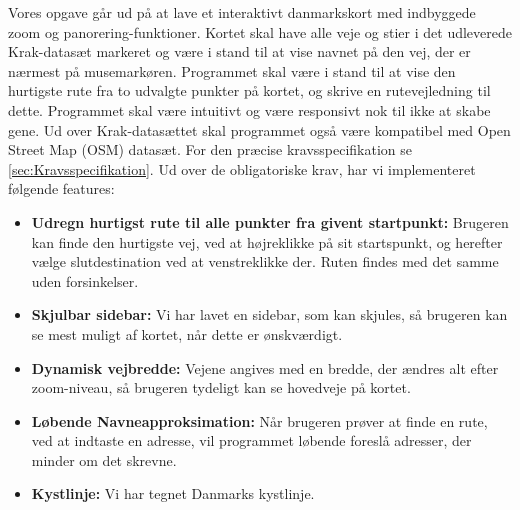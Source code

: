 Vores opgave går ud på at lave et interaktivt danmarkskort med indbyggede zoom og panorering-funktioner. Kortet skal have alle veje og stier i det udleverede Krak-datasæt markeret og være i stand til at vise navnet på den vej, der er nærmest på musemarkøren. Programmet skal være i stand til at vise den hurtigste rute fra to udvalgte punkter på kortet, og skrive en rutevejledning til dette. Programmet skal være intuitivt og være responsivt nok til ikke at skabe gene. Ud over Krak-datasættet skal programmet også være kompatibel med Open Street Map (OSM) datasæt. For den præcise kravsspecifikation se \ref{sec:Kravsspecifikation}.
\newline \newline
Ud over de obligatoriske krav, har vi implementeret følgende features:
\begin{itemize}
	\item \textbf{Udregn hurtigst rute til alle punkter fra givent startpunkt:} Brugeren kan finde den hurtigste vej, ved at højreklikke på sit startspunkt, og herefter vælge  slutdestination ved at venstreklikke der. Ruten findes med det samme uden forsinkelser.
	\item \textbf{Skjulbar sidebar:} Vi har lavet en sidebar, som kan skjules, så brugeren kan se mest muligt af kortet, når dette er ønskværdigt.
	\item \textbf{Dynamisk vejbredde:} Vejene angives med en bredde, der ændres alt efter zoom-niveau, så brugeren tydeligt kan se hovedveje på kortet.
	\item \textbf{Løbende Navneapproksimation:} Når brugeren prøver at finde en rute, ved at indtaste en adresse, vil programmet løbende foreslå adresser, der minder om det skrevne. 
	\item \textbf{Kystlinje:} Vi har tegnet Danmarks kystlinje.
\end{itemize}